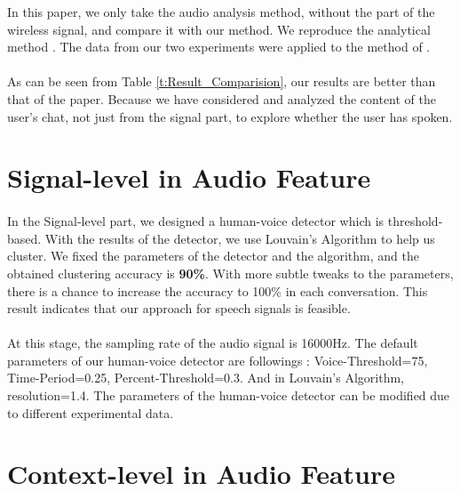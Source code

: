 \documentclass[a4paper,12pt]{report}
\begin{document}
In this paper, we only take the audio analysis method, without the part of the wireless signal, and compare it with our method. We reproduce the analytical method \cite{baker2017next2me}. The data from our two experiments were applied to the method of \cite{baker2017next2me}.

\paragraph{}
As can be seen from Table \ref{t:Result_Comparision}, our results are better than that of the paper. Because we have considered and analyzed the content of the user's chat, not just from the signal part, to explore whether the user has spoken.
\section{Signal-level in Audio Feature}
\paragraph{}
In the Signal-level part, we designed a human-voice detector which is threshold-based. With the results of the detector, we use Louvain's Algorithm to help us cluster. We fixed the parameters of the detector and the algorithm, and the obtained clustering accuracy is \textbf{90\%}. With more subtle tweaks to the parameters, there is a chance to increase the accuracy to 100\% in each conversation. This result indicates that our approach for speech signals is feasible.

\paragraph{}
At this stage, the sampling rate of the audio signal is 16000Hz. The default parameters of our human-voice detector are followings : Voice-Threshold=75, Time-Period=0.25, Percent-Threshold=0.3. And in Louvain's Algorithm, resolution=1.4. The parameters of the human-voice detector can be modified due to different experimental data.

\section{Context-level in Audio Feature}
\end{document}
